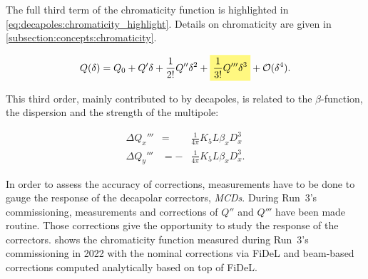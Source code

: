 \section{}


The full third term of the chromaticity function is highlighted in
\cref{eq:decapoles:chromaticity_highlight}. Details on chromaticity are given
in \cref{subsection:concepts:chromaticity}.

\begin{equation} 
    Q (\delta) = Q_0 + Q' \delta + \frac{1}{2!} Q'' \delta^2 
                     + \colorbox{yellow!50}{$\displaystyle  \frac{1}{3!}  Q''' \delta^3$}
                     + \mathcal{O}(\delta^4).
    \label{eq:decapoles:chromaticity_highlight}
\end{equation}

This third order, mainly contributed to by decapoles, is related to the $\beta$-function, the
dispersion and the strength of the multipole:

\begin{equation}
    \begin{aligned}
        \Delta Q_x''' &=  &\frac{1}{4\pi} K_{5} L \beta_x D_x^{3}\\
        \Delta Q_y''' &= -&\frac{1}{4\pi} K_{5} L \beta_x D_x^{3}.
    \end{aligned}
\end{equation}



In order to assess the accuracy of corrections, measurements have to be done to gauge the response
of the decapolar correctors, \textit{MCDs}.
During Run~3's commissioning, measurements and corrections of $Q''$ and $Q'''$ have been made
routine. Those corrections give the opportunity to study the response of the correctors.
 shows the chromaticity function measured during
Run~3's commissioning in 2022 with the nominal corrections via FiDeL and beam-based corrections
computed analytically based on top of FiDeL.

